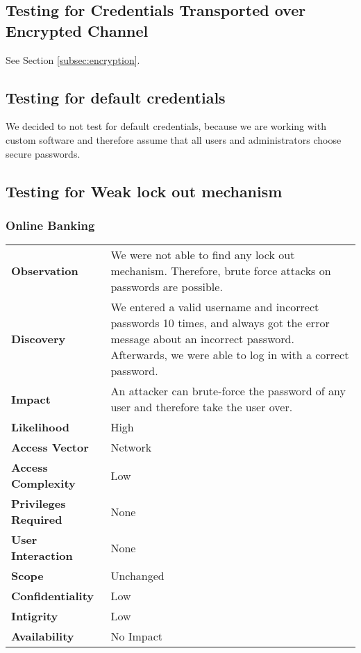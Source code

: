 \subsection{Testing for Credentials Transported over Encrypted Channel}
See Section \ref{subsec:encryption}.

\subsection{Testing for default credentials}
We decided to not test for default credentials, because we are working with custom software and therefore assume that all users and administrators choose secure passwords.

\clearpage


\subsection{Testing for Weak lock out mechanism}

\subsubsection*{Online Banking}

\begin{tabular}{l|p{10cm}}

\textbf{Observation} & We were not able to find any lock out mechanism. Therefore, brute force attacks on passwords are possible. \\
\textbf{Discovery} & We entered a valid username and incorrect passwords 10 times, and always got the error message about an incorrect password. Afterwards, we were able to log in with a correct password. \\
\textbf{Impact} & An attacker can brute-force the password of any user and therefore take the user over. \\
\textbf{Likelihood} & High \\
\textbf{Access Vector} & Network \\
\textbf{Access Complexity} & Low \\
\textbf{Privileges Required} & None \\
\textbf{User Interaction} & None \\
\textbf{Scope} & Unchanged \\
\textbf{Confidentiality} & Low \\
\textbf{Intigrity} & Low \\
\textbf{Availability} & No Impact \\
\end{tabular}

